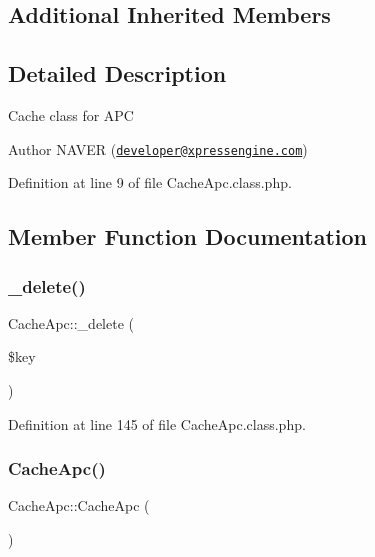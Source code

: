 \subsection*{Additional Inherited Members}


\subsection{Detailed Description}
Cache class for A\+PC

\begin{DoxyAuthor}{Author}
N\+A\+V\+ER (\href{mailto:developer@xpressengine.com}{\tt developer@xpressengine.\+com}) 
\end{DoxyAuthor}


Definition at line 9 of file Cache\+Apc.\+class.\+php.



\subsection{Member Function Documentation}
\mbox{\label{classCacheApc_a14d5f6b3e8743ea43ad3307816cec95d}} 
\subsubsection{\texorpdfstring{\+\_\+delete()}{\_delete()}}
{\footnotesize\ttfamily Cache\+Apc\+::\+\_\+delete (\begin{DoxyParamCaption}\item[{}]{\$key }\end{DoxyParamCaption})}



Definition at line 145 of file Cache\+Apc.\+class.\+php.

\mbox{\label{classCacheApc_ae75af46358f790955fce6c7fdb99ffdc}} 
\subsubsection{\texorpdfstring{Cache\+Apc()}{CacheApc()}}
{\footnotesize\ttfamily Cache\+Apc\+::\+Cache\+Apc (\begin{DoxyParamCaption}{ }\end{DoxyParamCaption})}

